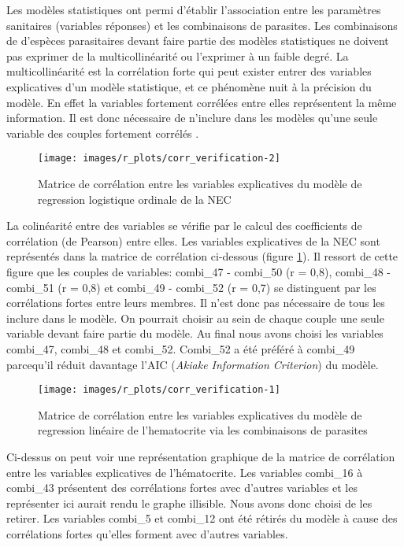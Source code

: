 Les modèles statistiques ont permi d'établir l'association entre les paramètres sanitaires 
(variables réponses) et les combinaisons de parasites. Les combinaisons de
d'espèces parasitaires devant faire partie des modèles statistiques ne doivent pas exprimer 
de la multicollinéarité ou l'exprimer à un faible degré. La multicollinéarité est la 
corrélation forte qui peut exister entrer des variables explicatives d'un modèle statistique,
et ce phénomène nuit à la précision du modèle. En effet la variables fortement corrélées 
entre elles représentent la même information. Il est donc nécessaire de n'inclure dans les 
modèles qu'une seule variable des couples fortement corrélés .


\begin{figure}[!ht]
	\texttt{[image: images/r\_plots/corr\_verification-2]}
	\caption{\label{fig:matrice_corr_nec}Matrice de corrélation entre les variables 
	explicatives du modèle de regression logistique ordinale de la NEC}
\end{figure}

\par La colinéarité entre des variables se vérifie par le calcul des 
coefficients de corrélation (de Pearson) entre elles.
Les variables explicatives de la NEC sont représentés dans la matrice de corrélation 
ci-dessous (figure \ref{fig:matrice_corr_nec}). Il ressort de cette figure que les 
couples de variables: combi\_47 - combi\_50 (r = 0,8), combi\_48 - combi\_51 
(r = 0,8) et combi\_49 - combi\_52 (r = 0,7) se distinguent par les corrélations 
fortes entre leurs membres. Il n'est donc pas nécessaire de tous les inclure dans 
le modèle. On pourrait choisir au sein de chaque couple une seule variable devant 
faire partie du modèle. Au final nous avons choisi les variables combi\_47, 
combi\_48 et combi\_52. Combi\_52 a été préféré à combi\_49 parcequ'il réduit 
davantage l'AIC (\textit{Akiake Information Criterion}) du modèle. 

\begin{figure}[!ht]
	\texttt{[image: images/r\_plots/corr\_verification-1]}
	\caption{\label{fig:matrice_corr_hem}Matrice de corrélation entre les variables 
	explicatives du modèle de regression linéaire de l'hematocrite via les 
	combinaisons de parasites}
\end{figure}

Ci-dessus on peut voir une représentation graphique de la matrice de corrélation 
entre les variables explicatives de l'hématocrite. Les variables combi\_16 à 
combi\_43 présentent des corrélations fortes avec d'autres variables et les 
représenter ici aurait rendu le graphe illisible. Nous avons donc choisi de les 
retirer. Les variables combi\_5 et combi\_12 ont été rétirés du modèle à cause des 
corrélations fortes qu'elles forment avec d'autres variables.

